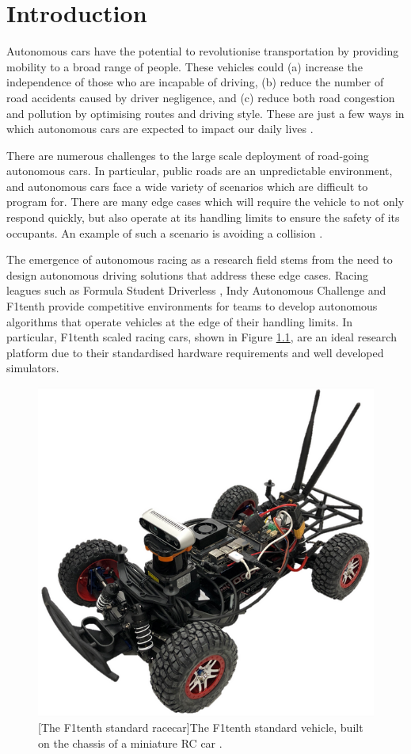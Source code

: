 \chapter{Introduction}
\label{chp:introduction}

Autonomous cars have the potential to revolutionise transportation by providing mobility to a broad range of people. 
These vehicles could (a) increase the independence of those who are incapable of driving, (b) reduce the number of road accidents caused by driver negligence, and (c) reduce both road congestion and pollution by optimising routes and driving style. 
These are just a few ways in which autonomous cars are expected to impact our daily lives \cite{klaver}. 

There are numerous challenges to the large scale deployment of road-going autonomous cars. 
In particular, public roads are an unpredictable environment, and autonomous cars face a wide variety of scenarios which are difficult to program for.
There are many edge cases which will require the vehicle to not only respond quickly, but also operate at its handling limits to ensure the safety of its occupants.
An example of such a scenario is avoiding a collision \cite{Barab_s_2017}. 

The emergence of autonomous racing as a research field stems from the need to design autonomous driving solutions that address these edge cases.
Racing leagues such as Formula Student Driverless \cite{Hanqing2018}, Indy Autonomous Challenge \cite{Wischnewski2022} and F1tenth \cite{Babu2020} provide competitive environments for teams to develop autonomous algorithms that operate vehicles at the edge of their handling limits.
In particular, F1tenth scaled racing cars, shown in Figure \ref{fig:f1tenth_car}, are an ideal research platform due to their standardised hardware requirements and well developed simulators.

\begin{figure}[htb]
\centering
  \includegraphics[width=.4\textwidth]{contents/chapt1/figs/f1tenth_car.png}
  [The F1tenth standard racecar]{The F1tenth standard vehicle, built on the chassis of a miniature RC car \cite{f1tenth}.}
  \label{fig:f1tenth_car}
\end{figure}

